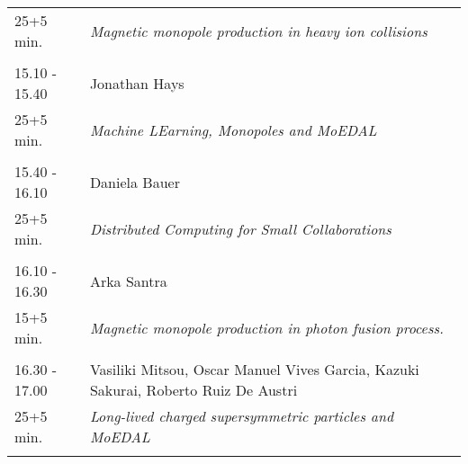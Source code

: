 \begin{longtable}{p{3cm}p{13cm}}
25+5 min. & {\it Magnetic monopole production in heavy ion collisions}\\ 
 & \\ 
15.10 - 15.40 & Jonathan Hays\\ 
25+5 min. & {\it Machine LEarning, Monopoles and MoEDAL}\\ 
 & \\ 
15.40 - 16.10 & Daniela Bauer\\ 
25+5 min. & {\it Distributed Computing for Small Collaborations}\\ 
 & \\ 
16.10 - 16.30 & Arka Santra\\ 
15+5 min. & {\it Magnetic monopole production in photon fusion process.}\\ 
 & \\ 
16.30 - 17.00 & Vasiliki Mitsou, Oscar Manuel Vives Garcia, Kazuki Sakurai, Roberto Ruiz De Austri\\ 
25+5 min. & {\it Long-lived charged supersymmetric particles and MoEDAL}\\ 
 & \\ 
\end{longtable}

